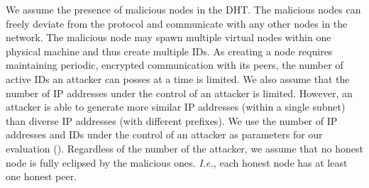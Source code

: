 We assume the presence of malicious nodes in the DHT. The malicious nodes can freely deviate from the protocol and communicate with any other nodes in the network. The malicious node may spawn multiple virtual nodes within one physical machine and thus create multiple IDs. As creating a node requires maintaining periodic, encrypted communication with its peers, the number of active IDs an attacker can posses at a time is limited. We also assume that the number of IP addresses under the control of an attacker is limited. However, an attacker is able to generate more similar IP addresses (within a single subnet) than diverse IP addresses (with different prefixes). We use the number of IP addresses and IDs under the control of an attacker as parameters for our evaluation (). Regardless of the number of the attacker, we assume that no honest node is fully eclipsed by the malicious ones. \textit{I.e.,} each honest node has at least one honest peer. 
